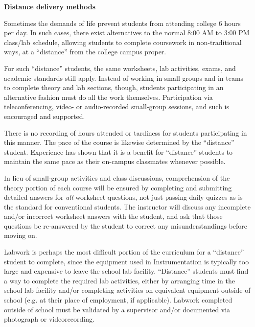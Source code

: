 


\centerline{\bf Distance delivery methods}

\vskip 10pt


Sometimes the demands of life prevent students from attending college 6 hours per day.  In such cases, there exist alternatives to the normal 8:00 AM to 3:00 PM class/lab schedule, allowing students to complete coursework in non-traditional ways, at a ``distance'' from the college campus proper.

For such ``distance'' students, the same worksheets, lab activities, exams, and academic standards still apply.  Instead of working in small groups and in teams to complete theory and lab sections, though, students participating in an alternative fashion must do all the work themselves.  Participation via teleconferencing, video- or audio-recorded small-group sessions, and such is encouraged and supported.

There is no recording of hours attended or tardiness for students participating in this manner.  The pace of the course is likewise determined by the ``distance'' student.  Experience has shown that it is a benefit for ``distance'' students to maintain the same pace as their on-campus classmates whenever possible.

In lieu of small-group activities and class discussions, comprehension of the theory portion of each course will be ensured by completing and submitting detailed answers for {\it all} worksheet questions, not just passing daily quizzes as is the standard for conventional students.  The instructor will discuss any incomplete and/or incorrect worksheet answers with the student, and ask that those questions be re-answered by the student to correct any misunderstandings before moving on.

Labwork is perhaps the most difficult portion of the curriculum for a ``distance'' student to complete, since the equipment used in Instrumentation is typically too large and expensive to leave the school lab facility.  ``Distance'' students must find a way to complete the required lab activities, either by arranging time in the school lab facility and/or completing activities on equivalent equipment outside of school (e.g. at their place of employment, if applicable).  Labwork completed outside of school must be validated by a supervisor and/or documented via photograph or videorecording.

